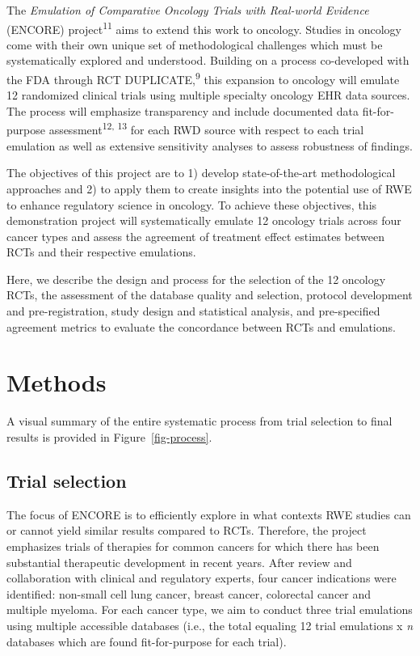 \documentclass[
  letterpaper,
  DIV=11,
  numbers=noendperiod]{scrartcl}
\begin{document}
The \emph{Emulation of Comparative Oncology Trials with Real-world
Evidence} (ENCORE) project\textsuperscript{11} aims to extend this work
to oncology. Studies in oncology come with their own unique set of
methodological challenges which must be systematically explored and
understood. Building on a process co-developed with the FDA through RCT
DUPLICATE,\textsuperscript{9} this expansion to oncology will emulate 12
randomized clinical trials using multiple specialty oncology EHR data
sources. The process will emphasize transparency and include documented
data fit-for-purpose assessment\textsuperscript{12, 13} for each RWD
source with respect to each trial emulation as well as extensive
sensitivity analyses to assess robustness of findings.

The objectives of this project are to 1) develop state-of-the-art
methodological approaches and 2) to apply them to create insights into
the potential use of RWE to enhance regulatory science in oncology. To
achieve these objectives, this demonstration project will systematically
emulate 12 oncology trials across four cancer types and assess the
agreement of treatment effect estimates between RCTs and their
respective emulations.

Here, we describe the design and process for the selection of the 12
oncology RCTs, the assessment of the database quality and selection,
protocol development and pre-registration, study design and statistical
analysis, and pre-specified agreement metrics to evaluate the
concordance between RCTs and emulations.

\section{Methods}\label{methods}

A visual summary of the entire systematic process from trial selection
to final results is provided in Figure~\ref{fig-process}.

\subsection{Trial selection}\label{trial-selection}

The focus of ENCORE is to efficiently explore in what contexts RWE
studies can or cannot yield similar results compared to RCTs. Therefore,
the project emphasizes trials of therapies for common cancers for which
there has been substantial therapeutic development in recent years.
After review and collaboration with clinical and regulatory experts,
four cancer indications were identified: non-small cell lung cancer,
breast cancer, colorectal cancer and multiple myeloma. For each cancer
type, we aim to conduct three trial emulations using multiple accessible
databases (i.e., the total equaling 12 trial emulations x \emph{n}
databases which are found fit-for-purpose for each trial).
\end{document}
